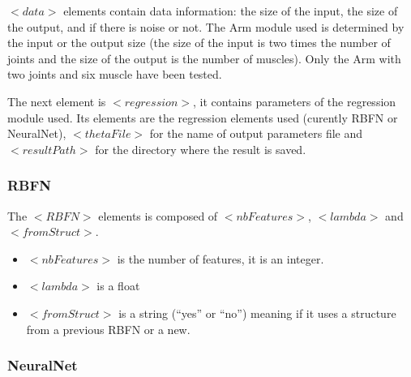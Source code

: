 \documentclass[a4paper]{article}
\begin{document}
$<data>$ elements contain data information: the size of the input, the size of the output, and if there is noise or not. 
The Arm module used is determined by the input or the output size (the size of the input is two times the number of joints and the size of the output is the number of muscles). Only the Arm with two joints and six muscle have been tested.

The next element is $<regression>$, it contains parameters of the regression module used. Its elements are the regression elements used (curently RBFN or NeuralNet), $<thetaFile>$ for the name of output parameters file and $<resultPath>$ for the directory where the result is saved.

\subsubsection*{RBFN}
The $<RBFN>$ elements is composed of $<nbFeatures>$, $<lambda>$ and $<fromStruct>$.
\begin{itemize}
\item
$<nbFeatures>$ is the number of features, it is an integer.
\item
$<lambda>$ is a float
\item
$<fromStruct>$ is a string (``yes'' or ``no'') meaning if it uses a structure from a previous RBFN or a new.
\end{itemize}

\subsubsection*{NeuralNet}
\end{document}
